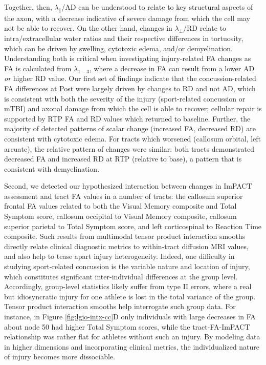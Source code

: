 \documentclass[12pt]{article}
\begin{document}
Together, then, $\lambda_\parallel$/AD can be understood to relate to key structural aspects of the axon, with a decrease indicative of severe damage from which the cell may not be able to recover. On the other hand, changes in $\lambda_\perp$/RD relate to intra/extracellular water ratios and their respective differences in tortuosity, which can be driven by swelling, cytotoxic edema, and/or demyelination. Understanding both is critical when investigating injury-related FA changes as FA is calculated from $\lambda_{1-3}$, where a decrease in FA can result from a lower AD \textit{or} higher RD value. Our first set of findings indicate that the concussion-related FA differences at Post were largely driven by changes to RD and not AD, which is consistent with both the severity of the injury (sport-related concussion or mTBI) and axonal damage from which the cell is able to recover; cellular repair is supported by RTP FA and RD values which returned to baseline. Further, the majority of detected patterns of scalar change (increased FA, decreased RD) are consistent with cytotoxic edema. For tracts which worsened (callosum orbital, left arcuate), the relative pattern of changes were similar: both tracts demonstrated decreased FA and increased RD at RTP (relative to base), a pattern that is consistent with demyelination.

Second, we detected our hypothesized interaction between changes in ImPACT assessment and tract FA values in a number of tracts: the callosum superior frontal FA values related to both the Visual Memory composite and Total Symptom score, callosum occipital to Visual Memory composite, callosum superior parietal to Total Symptom score, and left corticospinal to Reaction Time composite. Such results from multimodal tensor product interaction smooths directly relate clinical diagnostic metrics to within-tract diffusion MRI values, and also help to tease apart injury heterogeneity. Indeed, one difficulty in studying sport-related concussion is the variable nature and location of injury, which constitutes significant inter-individual differences at the group level. Accordingly, group-level statistics likely suffer from type II errors, where a real but idiosyncratic injury for one athlete is lost in the total variance of the group. Tensor product interaction smooths help interrogate such group data. For instance, in Figure \ref{fig:lgio-intx-cc}D only individuals with large decreases in FA about node 50 had higher Total Symptom scores, while the tract-FA-ImPACT relationship was rather flat for athletes without such an injury. By modeling data in higher dimensions and incorporating clinical metrics, the individualized nature of injury becomes more dissociable.
\end{document}
